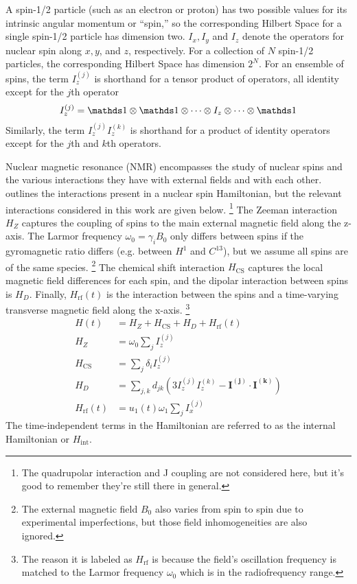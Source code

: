 A spin-1/2 particle (such as an electron or proton) has two possible values for its intrinsic angular momentum or ``spin,'' so the corresponding Hilbert Space for a single spin-1/2 particle has dimension two. $I_x, I_y$ and $I_z$ denote the operators for nuclear spin along $x, y$, and $z$, respectively. For a collection of $N$ spin-1/2 particles, the corresponding Hilbert Space has dimension $2^N$.
For an ensemble of spins, the term $I_z^{(j)}$ is shorthand for a tensor product of operators, all identity except for the $j$th operator
\[
I_z^{(j)} = \identity \otimes \identity \otimes \dots \otimes I_z \otimes \dots \otimes \identity
\]
Similarly, the term $I_z^{(j)}I_z^{(k)}$ is shorthand for a product of identity operators except for the $j$th and $k$th operators.

Nuclear magnetic resonance (NMR) encompasses the study of nuclear spins and the various interactions they have with external fields and with each other.
\cite{1976ii} outlines the interactions present in a nuclear spin Hamiltonian, but the relevant interactions considered in this work are given below.%
\footnote{The quadrupolar interaction and J coupling are not considered here, but it's good to remember they're still there in general.}
The Zeeman interaction $H_Z$ captures the coupling of spins to the main external magnetic field along the z-axis. The Larmor frequency $\omega_0 = \gamma_i B_0$ only differs between spins if the gyromagnetic ratio differs (e.g. between $H^1$ and $C^{13}$), but we assume all spins are of the same species.%
\footnote{The external magnetic field $B_0$ also varies from spin to spin due to experimental imperfections, but those field inhomogeneities are also ignored.}
The chemical shift interaction $H_{\text{CS}}$ captures the local magnetic field differences for each spin, and the dipolar interaction between spins is $H_D$. Finally, $H_\text{rf}(t)$ is the interaction between the spins and a time-varying transverse magnetic field along the x-axis.%
\footnote{The reason it is labeled as $H_\text{rf}$ is because the field's oscillation frequency is matched to the Larmor frequency $\omega_0$ which is in the radiofrequency range.}
\begin{align}\label{eq:nmr-ham}
    H(t) &= H_Z + H_\text{CS} + H_D + H_\text{rf}(t) \\
    H_Z &= \omega_0 \sum_j I_z^{(j)} \\
    H_\text{CS} &= \sum_j \delta_i I_z^{(j)} \\
    H_D &= \sum_{j,k} d_{jk} \left( 3I_z^{(j)}I_z^{(k)} - \mathbf{I^{(j)}} \cdot \mathbf{I^{(k)}} \right) \\
    H_{\text{rf}}(t) &=  u_1(t) \omega_1 \sum_j I_x^{(j)}
\end{align}
The time-independent terms in the Hamiltonian are referred to as the internal Hamiltonian or $H_{\text{int}}$.

